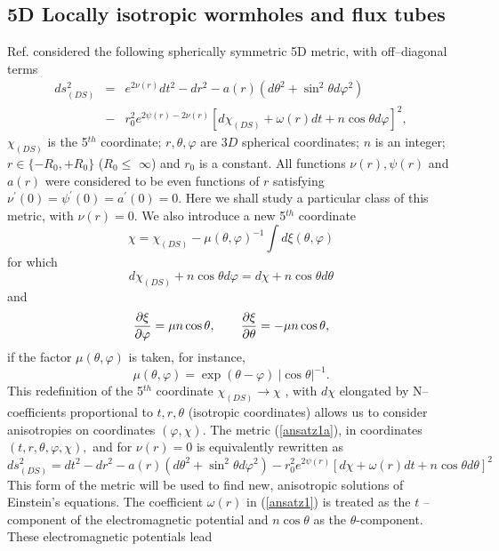\documentclass[a4paper,preprint,prabib,aps]{revtex4}
\begin{document}
\subsection{5D Locally isotropic wormholes and flux tubes}

Ref. \cite{ds} considered the following spherically symmetric 5D metric,
with off--diagonal terms
\begin{eqnarray}
ds_{(DS)}^{2} &=&e^{2\nu (r)}dt^{2}-dr^{2}-a(r)(d\theta ^{2}+\sin ^{2}\theta
d\varphi ^{2})  \label{ansatz1a} \\
&-&r_{0}^{2}e^{2\psi (r)-2\nu (r)}\left[ d\chi _{(DS)}+\omega (r)dt+n\cos
\theta d\varphi \right] ^{2},  \nonumber
\end{eqnarray}
$\chi _{(DS)}$ is the 5$^{th}$ coordinate; $r,\theta ,\varphi $ are $3D$
spherical coordinates; $n$ is an integer; $r\in \{-R_{0},+R_{0}\}$ ($%
R_{0}\leq $ $\infty $) and $r_{0}$ is a constant. All functions $\nu
(r),\psi (r)$ and $a(r)$ were considered to be even functions of $r$
satisfying $\nu ^{\prime }(0)=\psi ^{\prime }(0)=a^{\prime }(0)=0$. Here we
shall study a particular class of this metric, with $\nu (r)=0$. We also
introduce a new 5$^{th}$ coordinate
\[
\chi =\chi _{(DS)}-\mu (\theta ,\varphi )^{-1}\int d\xi (\theta ,\varphi )
\]
for which
\[
d\chi _{(DS)}+n\cos \theta d\varphi =d\chi +n\cos \theta d\theta
\]
and
\[
\frac{\partial \xi }{\partial \varphi }=\mu n\cos \theta ,\qquad \frac{%
\partial \xi }{\partial \theta }=-\mu n\cos \theta ,
\]
if the factor $\mu (\theta ,\varphi )$ is taken, for instance,
\[
\mu (\theta ,\varphi )=\exp (\theta -\varphi )\  |\cos \theta |^{-1}.
\]
This redefinition of the 5$^{th}$ coordinate $\chi _{(DS)}\rightarrow \chi $%
, with $d\chi $ elongated by N--coefficients proportional to $t,r,\theta $
(isotropic coordinates) allows us to consider anisotropies on coordinates $%
\left( \varphi ,\chi \right) $. The metric (\ref{ansatz1a}), in coordinates $%
(t,r,\theta ,\varphi ,\chi ),$ and for $\nu (r)=0$ is equivalently rewritten
as
\begin{equation}
ds_{(DS)}^{2}=dt^{2}-dr^{2}-a(r)(d\theta ^{2}+\sin ^{2}\theta d\varphi
^{2})-r_{0}^{2}e^{2\psi (r)}\left[ d\chi +\omega (r)dt+n\cos \theta d\theta %
\right] ^{2}  \label{ansatz1}
\end{equation}
This form of the metric will be used to find new, anisotropic solutions of
Einstein's equations. The coefficient $\omega (r)$ in (\ref{ansatz1}) is
treated as the $t$ --component of the electromagnetic potential and $n\cos
\theta $ as the $\theta $-component. These electromagnetic potentials lead
\end{document}
